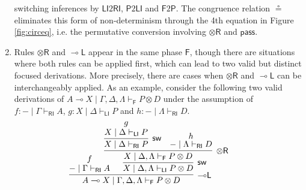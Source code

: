 \documentclass[submission,copyright,creativecommons]{eptcs}
\theoremstyle{definition}
\newcommand{\tr}{\otimes \mathsf{R}}
\newcommand{\lleft}{{\multimap}\mathsf{L}}
\newcommand{\pass}{\mathsf{pass}}
\newcommand{\ot}{\otimes}
\newcommand{\lolli}{\multimap}
\newcommand{\RI}{\mathsf{RI}}
\newcommand{\LI}{\mathsf{LI}}
\newcommand{\Pass}{\mathsf{P}}
\newcommand{\F}{\mathsf{F}}
\newcommand{\proofbox}[1]{\begin{tabular}{l} #1 \end{tabular}}
\begin{document}
\begin{enumerate}
  switching inferences by $\LI2\RI$, $\Pass2\LI$ and $\F2\Pass$.
  The congruence relation $\circeq$ eliminates this form of non-determinism through the 4th equation in Figure \ref{fig:circeq}, i.e. the permutative conversion involving $\tr$ and $\pass$.
  \item Rules $\tr$ and $\lleft$ appear in the same phase $\F$, though there are situations where both rules can be applied first, which can lead to two valid but distinct focused derivations. More precisely, there are cases when $\tr$ and $\lleft$ can be interchangeably applied. As an example, consider the following two valid derivations of $A \lolli X \mid \Gamma , \Delta , \Lambda \vdash_{\F} P \ot D$ under the assumption of $f : - \mid \Gamma \vdash_{\RI} A$, $g : X \mid \Delta \vdash_{\LI} P$ and $h : - \mid \Lambda \vdash_{\RI} D$.
    \begin{equation}\label{eq:llefttr}
      \hspace{-.5cm}
      \proofbox{
      \infer[\lleft]{A \lolli X \mid \Gamma , \Delta , \Lambda \vdash_{\F} P \ot D}{
        \deduce{- \mid \Gamma \vdash_{\RI} A}{f}
        &\hspace{-.6cm}
        \infer[\mathsf{sw}]{X \mid \Delta , \Lambda \vdash_{\LI} P \ot D}{
          \infer[\tr]{X \mid \Delta , \Lambda \vdash_{\F} P\ot D}{
            \infer[\mathsf{sw}]{X \mid \Delta \vdash_{\RI} P}{
              \deduce{X \mid \Delta \vdash_{\LI} P}{g}
            }
            &
            \deduce{- \mid \Lambda \vdash_{\RI} D}{h}
          }
        }
      }
      \hspace{.2cm}
}
\end{equation}
\end{enumerate}
\end{document}
